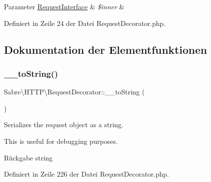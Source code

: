 \begin{DoxyParams}[1]{Parameter}
\mbox{\hyperlink{interface_sabre_1_1_h_t_t_p_1_1_request_interface}{Request\+Interface}} & {\em \$inner} & \\
\hline
\end{DoxyParams}


Definiert in Zeile 24 der Datei Request\+Decorator.\+php.



\subsection{Dokumentation der Elementfunktionen}
\mbox{\label{class_sabre_1_1_h_t_t_p_1_1_request_decorator_a95698fd1b0719895d4db58964832dd06}} 
\subsubsection{\texorpdfstring{\+\_\+\+\_\+to\+String()}{\_\_toString()}}
{\footnotesize\ttfamily Sabre\textbackslash{}\+H\+T\+T\+P\textbackslash{}\+Request\+Decorator\+::\+\_\+\+\_\+to\+String (\begin{DoxyParamCaption}{ }\end{DoxyParamCaption})}

Serializes the request object as a string.

This is useful for debugging purposes.

\begin{DoxyReturn}{Rückgabe}
string 
\end{DoxyReturn}


Definiert in Zeile 226 der Datei Request\+Decorator.\+php.

\mbox{\label{class_sabre_1_1_h_t_t_p_1_1_request_decorator_a5534f8c39e2618f40c5c1ff41c44a5ab}} 
